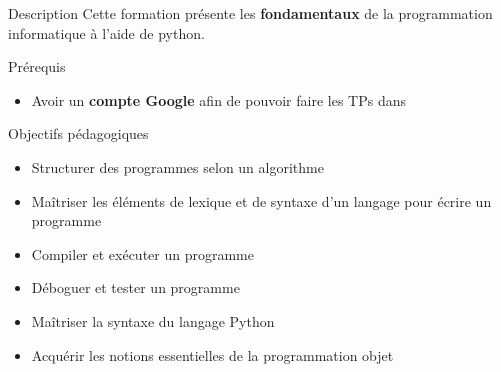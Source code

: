 
\begin{frame}{Description}
  Cette formation présente les \textbf{fondamentaux} de la programmation informatique à l'aide de python.
\end{frame}

\begin{frame}{Prérequis}
  \begin{itemize}
  \item Avoir un \textbf{compte Google} afin de pouvoir faire les TPs dans 
  \end{itemize}
\end{frame}

\begin{frame}{Objectifs pédagogiques}
  \begin{itemize}
  \item Structurer des programmes selon un algorithme
  \item Maîtriser les éléments de lexique et de syntaxe d'un langage pour écrire un programme
  \item Compiler et exécuter un programme
  \item Déboguer et tester un programme
  \item Maîtriser la syntaxe du langage Python
  \item Acquérir les notions essentielles de la programmation objet
  \end{itemize}
\end{frame}
